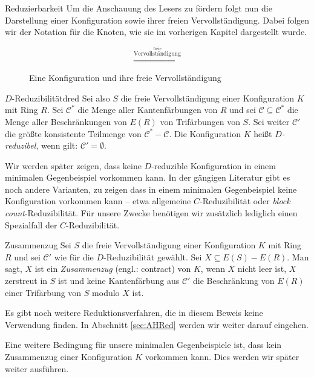 \begin{section}{Reduzierbarkeit}
 Um die Anschauung des Lesers zu fördern folgt nun die Darstellung einer Konfiguration sowie ihrer freien Vervollständigung. Dabei folgen wir der Notation für die Knoten, wie sie im vorherigen Kapitel dargestellt wurde.
 
 \begin{figure}[hb]
  \label{fig2}
  \[  \overset{\overset{\text{freie}}{\text{Vervollständigung}}}{\Longrightarrow}  \]
  \caption[Eine Konfiguration und ihre freie Vervollständigung]{Eine Konfiguration und ihre freie Vervollständigung}
 \end{figure}

 
 \begin{definitionl}{$D$-Reduzibilität}{dred}
  Sei also $S$ die freie Vervollständigung einer Konfiguration $K$ mit Ring $R$. Sei $\mathscr{C}^*$ die Menge aller Kantenfärbungen von $R$ und sei $\mathscr{C} \subseteq \mathscr{C}^*$ die Menge aller Beschränkungen von $E(R)$ von Trifärbungen von $S$. Sei weiter $\mathscr{C}'$ die größte konsistente Teilmenge von $\mathscr{C}^* - \mathscr{C}$. Die Konfiguration $K$ heißt \textit{$D$-reduzibel}, wenn gilt: $\mathscr{C}' = \emptyset$.
 \end{definitionl}
 
 Wir werden später zeigen, dass keine $D$-reduzible Konfiguration in einem minimalen Gegenbeispiel vorkommen kann. In der gängigen Literatur gibt es noch andere Varianten, zu zeigen dass in einem minimalen Gegenbeispiel keine Konfiguration vorkommen kann -- etwa allgemeine $C$-Reduzibilität oder \textit{block count}-Reduzibilität. Für unsere Zwecke benötigen wir zusätzlich lediglich einen Spezialfall der $C$-Reduzibilität.

 \begin{definition}{Zusammenzug}
  Sei $S$ die freie Vervollständigung einer Konfiguration $K$ mit Ring $R$ und sei $\mathscr{C}'$ wie für die $D$-Reduzibilität gewählt. Sei $X \subseteq E(S) - E(R)$. Man sagt, $X$ ist ein \textit{Zusammenzug} (engl.: contract) von $K$, wenn $X$ nicht leer ist, $X$ zerstreut in $S$ ist und keine Kantenfärbung aus $\mathscr{C}'$ die Beschränkung von $E(R)$ einer Trifärbung von $S$ modulo $X$ ist.
 \end{definition}
 
 Es gibt noch weitere Reduktionsverfahren, die in diesem Beweis keine Verwendung finden. In Abschnitt \ref{sec:AHRed} werden wir weiter darauf eingehen.
 
 Eine weitere Bedingung für unsere minimalen Gegenbeispiele ist, dass kein Zusammenzug einer Konfiguration $K$ vorkommen kann. Dies werden wir später weiter ausführen.
 

\end{section}

